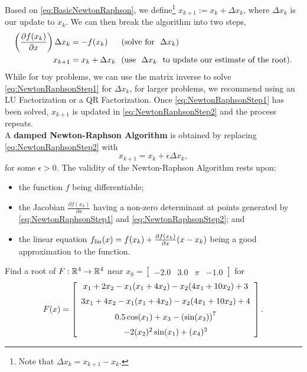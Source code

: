 \vspace*{0.2cm}
\begin{tcolorbox}[title=\textbf{Alternative Form of the Newton-Raphson Algorithm}]
Based on \eqref{eq:BasicNewtonRaphson}, we define\footnote{Note that $\Delta x_k = x_{k+1}-x_k$.} $x_{k+1}:= x_k + \Delta x_k$, where $ \Delta x_k$ is our update to $x_k$. We can then break the algorithm into two steps,
\begin{align}
\label{eq:NewtonRaphsonStep1}
\left(\frac{\partial f(x_k)}{\partial x} \right) \Delta x_{k} &= - f(x_k) \hspace*{0.58cm}(\text{solve for}~~\Delta x_k)  \\
\label{eq:NewtonRaphsonStep2}
x_{k+1}&= x_k + \Delta x_{k}~~(\text{use~~} \Delta x_k ~~\text{to update our estimate of the root}).
\end{align}
While for toy problems, we can use the matrix inverse to solve \eqref{eq:NewtonRaphsonStep1} for $\Delta x_{k}$, for larger problems, we recommend using an LU Factorization or a QR Factorization. Once \eqref{eq:NewtonRaphsonStep1}  has been solved, $x_{k+1}$ is updated in \eqref{eq:NewtonRaphsonStep2} and the process repeats.\\

A \textbf{damped Newton-Raphson Algorithm} is obtained by replacing \eqref{eq:NewtonRaphsonStep2} with   
\begin{equation}
    \label{eq:NewtonRaphsonStep3}
x_{k+1}= x_k + \epsilon \Delta x_{k},
\end{equation}
for some $\epsilon >0$.
 The validity of the Newton-Raphson Algorithm rests upon: 
\begin{itemize}
    \item the function $f$ being differentiable;
    \item the Jacobian $\frac{\partial f(x_k)}{ \partial x}$ having a non-zero determinant at points generated by \eqref{eq:NewtonRaphsonStep1} and \eqref{eq:NewtonRaphsonStep2}; and
    \item the linear equation $f_{\rm lin}(x) = f(x_k) + \frac{\partial f(x_k)}{ \partial x} (x - x_k) $ being a good approximation to the function.
\end{itemize}
\end{tcolorbox}
    

\begin{example}
\label{ex:NewtonRaphson}
Find a root of $F:\mathbb R^4 \to \mathbb R^4$ near $x_0=\left[\begin{array}{cccc} -2.0 & 3.0 & \pi &-1.0\end{array} \right]$ for
$$
F(x)=\left[\begin{array}{c}
   x_1 + 2 x_2 - x_1 (x_1 + 4 x_2) - x_2 (4 x_1 + 10 x_2) + 3 \medskip \\
 3 x_1 + 4 x_2 - x_1 (x_1 + 4 x_2) - x_2 (4 x_1 + 10 x_2) + 4  \medskip\\
                                0.5 \cos(x_1) + x_3 -\left( \sin(x_3) \right)^7  \medskip\\
                              -  2(x_2)^2  \sin(x_1) + (x_4)^3
\end{array} \right].
$$

\end{example}

